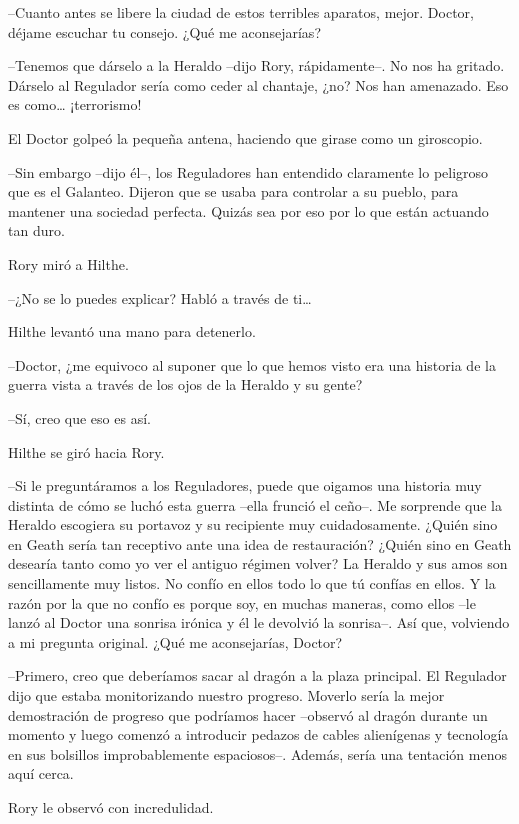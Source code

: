 {--Cuanto antes se libere la ciudad de estos terribles aparatos,
mejor. Doctor, déjame escuchar tu consejo. ¿Qué me aconsejarías?}

{--Tenemos que dárselo a la Heraldo --dijo Rory, rápidamente--. No nos
	ha gritado. Dárselo al Regulador sería como ceder al chantaje, ¿no? Nos
	han amenazado. Eso es como\ldots{} ¡terrorismo!}

{El Doctor golpeó la pequeña antena, haciendo que girase como un
giroscopio.}

{--Sin embargo --dijo él--, los Reguladores han entendido claramente
	lo peligroso que es el Galanteo. Dijeron que se usaba para controlar a
	su pueblo, para mantener una sociedad perfecta. Quizás sea por eso por
lo que están actuando tan duro.}

{Rory miró a Hilthe.}

{--¿No se lo puedes explicar? Habló a través de ti\ldots{}}

{Hilthe levantó una mano para detenerlo.}

{--Doctor, ¿me equivoco al suponer que lo que hemos visto era una
	historia de la guerra vista a través de los ojos de la Heraldo y su
gente?}

{--Sí, creo que eso es así.}

{Hilthe se giró hacia Rory.}

{--Si le preguntáramos a los Reguladores, puede que oigamos una
	historia muy distinta de cómo se luchó esta guerra --ella frunció el
	ceño--. Me sorprende que la Heraldo escogiera su portavoz y su
	recipiente muy cuidadosamente. ¿Quién sino en Geath sería tan receptivo
	ante una idea de restauración? ¿Quién sino en Geath desearía tanto como
	yo ver el antiguo régimen volver? La Heraldo y sus amos son
	sencillamente muy listos. No confío en ellos todo lo que tú confías en
	ellos. Y la razón por la que no confío es porque soy, en muchas maneras,
	como ellos --le lanzó al Doctor una sonrisa irónica y él le devolvió la
	sonrisa--. Así que, volviendo a mi pregunta original. ¿Qué me
aconsejarías, Doctor?}

{--Primero, creo que deberíamos sacar al dragón a la plaza principal.
	El Regulador dijo que estaba monitorizando nuestro progreso. Moverlo
	sería la mejor demostración de progreso que podríamos hacer --observó al
	dragón durante un momento y luego comenzó a introducir pedazos de cables
	alienígenas y tecnología en sus bolsillos improbablemente espaciosos--.
Además, sería una tentación menos aquí cerca.}

{Rory le observó con incredulidad.}

